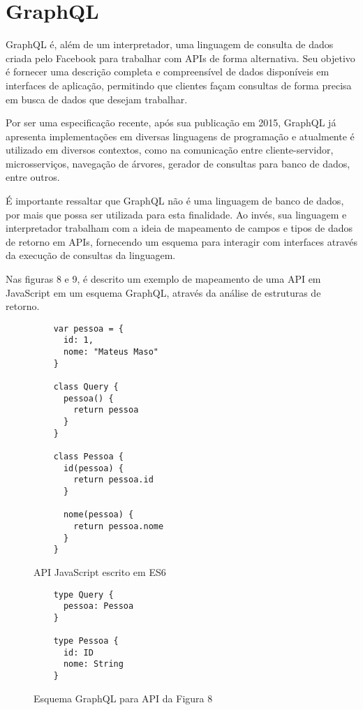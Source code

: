 \chapter{GraphQL}

GraphQL é, além de um interpretador, uma linguagem de consulta de dados criada pelo Facebook para trabalhar com APIs de forma alternativa. Seu objetivo é fornecer uma descrição completa e compreensível de dados disponíveis em interfaces de aplicação, permitindo que clientes façam consultas de forma precisa em busca de dados que desejam trabalhar. \cite{Facebook2016}

Por ser uma especificação recente, após sua publicação em 2015, GraphQL já apresenta implementações em diversas linguagens de programação e atualmente é utilizado em diversos contextos, como na comunicação entre cliente-servidor, microsserviços, navegação de árvores, gerador de consultas para banco de dados, entre outros.

É importante ressaltar que GraphQL não é uma linguagem de banco de dados, por mais que possa ser utilizada para esta finalidade. Ao invés, sua linguagem e interpretador trabalham com a ideia de mapeamento de campos e tipos de dados de retorno em APIs, fornecendo um esquema para interagir com interfaces através da execução de consultas da linguagem. \cite{Facebook2016}

Nas figuras 8 e 9, é descrito um exemplo de mapeamento de uma API em JavaScript em um esquema GraphQL, através da análise de estruturas de retorno.

\begin{figure}[H]
  \centering
  \begin{verbatim}
    var pessoa = {
      id: 1,
      nome: "Mateus Maso"
    }

    class Query {
      pessoa() {
        return pessoa
      }
    }

    class Pessoa {
      id(pessoa) {
        return pessoa.id
      }

      nome(pessoa) {
        return pessoa.nome
      }
    }
  \end{verbatim}
  \caption{API JavaScript escrito em ES6}
\end{figure}

\begin{figure}[H]
  \centering
  \begin{verbatim}
    type Query {
      pessoa: Pessoa
    }

    type Pessoa {
      id: ID
      nome: String
    }
  \end{verbatim}
  \caption{Esquema GraphQL para API da Figura 8}
\end{figure}

